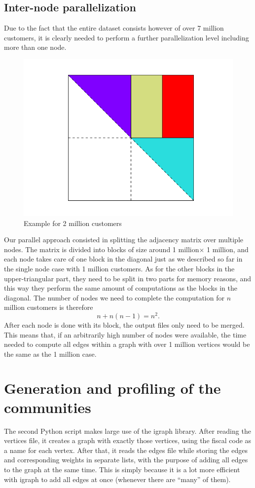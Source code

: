 \documentclass[a4paper,11pt]{book}
\begin{document}
\subsection{Inter-node parallelization}
Due to the fact that the entire dataset consists however of over 7 million customers, it is clearly needed to perform a further parallelization level including more than one node.
 \begin{figure}[H]
\centering
\includegraphics[height=7.0 cm,width=10 cm]{division.png}
\caption{Example for 2 million customers}
\end{figure}
Our parallel approach consisted in splitting the adjacency matrix over multiple nodes. The matrix is divided into blocks of size around 1 million$\times$ 1 million, and each node takes care of one block in the diagonal just as we described so far in the single node case with 1 million customers. As for the other blocks in the upper-triangular part, they need to be split in two parts for memory reasons, and this way they perform the same amount of computations as the blocks in the diagonal. The number of nodes we need to complete the computation for $n$ million customers is therefore
$$
n+n(n-1) = n^2.
$$
After each node is done with its block, the output files only need to be merged. This means that, if an arbitrarily high number of nodes were available, the time needed to compute all edges within a graph with over 1 million vertices would be the same as the 1 million case.
\section{Generation and profiling of the communities}\label{sec:tables}
The second Python script makes large use of the igraph library. After reading the vertices file, it creates a graph with exactly those vertices, using the fiscal code as a name for each vertex. After that, it reads the edges file while storing the edges and corresponding weights in separate lists, with the purpose of adding all edges to the graph at the same time. This is simply because it is a lot more efficient with igraph to add all edges at once (whenever there are ``many'' of them).\\
\end{document}
